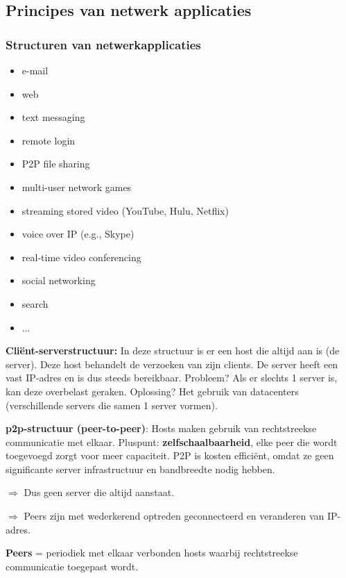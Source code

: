 \subsection{Principes van netwerk applicaties}

\subsubsection{Structuren van netwerkapplicaties}

\begin{multicols}{2}
  \begin{itemize}
      \item e-mail
 \item web
 \item text messaging
 \item remote login
 \item P2P file sharing
 \item multi-user network games
 \item streaming stored video (YouTube, Hulu, Netflix)
 \item voice over IP (e.g., Skype)
 \item real-time video conferencing
 \item social networking
 \item search
 \item ...
  \end{itemize}
\end{multicols}

\noindent \textbf{Cliënt-serverstructuur:} In deze structuur is er een host die altijd aan is (de server). Deze host behandelt de verzoeken van zijn clients. De server heeft een vast IP-adres en is dus steeds bereikbaar. Probleem? Als er slechts 1 server is, kan deze overbelast geraken. Oplossing? Het gebruik van datacenters (verschillende servers die samen 1 server vormen).

\noindent \textbf{\acrshort{p2p}-structuur (peer-to-peer)}: Hosts maken gebruik van rechtstreekse communicatie met elkaar. Pluspunt: \textbf{zelfschaalbaarheid}, elke peer die wordt toegevoegd zorgt voor meer capaciteit. P2P is kosten efficiënt, omdat ze geen significante server infrastructuur en bandbreedte nodig hebben.

\noindent $\Rightarrow$ Dus geen server die altijd aanstaat.

\noindent $\Rightarrow$ Peers zijn met wederkerend optreden geconnecteerd en veranderen van IP-adres.

\textbf{Peers} = periodiek met elkaar verbonden hosts waarbij rechtstreekse communicatie toegepast wordt.

